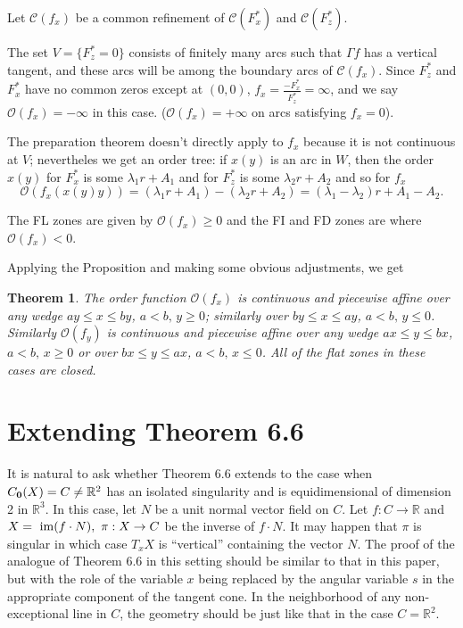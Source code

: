 \documentclass[article]{amsart}
\newtheorem{theorem}{Theorem}[section]
\newcommand{\R}{\mathbb R}
\newcommand{\0}{{\bf 0}}
\begin{document}
Let $\mathcal{C}(f_x)$ be a common refinement of 
$\mathcal{C}(F_x^*)$ and $\mathcal{C}(F_z^*)$.
 
The set $V = \{ F^*_z =0\}$ consists of finitely many arcs such that $\Gamma f$ has a vertical tangent, and these arcs will be among the boundary  arcs of  $\mathcal{C}(f_x)$. Since $F^*_z$ and  $F^*_x$ have no common zeros except at $(0,0)$, $f_x=\frac{-F^*_x}{F_z^*} =\infty$, and we say $\mathcal{O}(f_x)=-\infty$ in this case. ($\mathcal{O}(f_x)=+\infty$ on arcs satisfying $f_x=0$).

The preparation theorem doesn't directly apply to $f_x$ because it is not continuous at $V$; nevertheles we get an order tree:
if $x(y)$ is an arc in $W$, then the order $x(y)$ for $F_x^*$ is some $\lambda_1r + A_1$ and for $F_z^*$ is some $\lambda_2r + A_2$ and so for $f_x $ $$\mathcal{O}(f_x(x(y)y)) =(\lambda_1r+A_1)-(\lambda_2r + A_2) = (\lambda_1 -\lambda_2)r + A_1 - A_2.$$ 

The FL zones are given by $\mathcal{O}(f_x) \ge 0$ and the FI and FD zones are where $\mathcal{O}(f_x) <0$.

Applying the Proposition and making some obvious adjustments, we get  

\begin{theorem} The order function $\mathcal{O}(f_x)$ is continuous and piecewise affine over any wedge  $ay\le x\le by$, $a<b,\, y\ge 0$; similarly over  $by\le x\le ay$, $a<b,\, y \le 0$.  Similarly $\mathcal{O}(f_y)$ is continuous and piecewise affine over any wedge  $ax\le y\le bx$, $a<b,\, x\ge 0$ or over  $bx\le y\le ax$, $a<b,\, x \le 0$.  All of the flat zones in these cases are closed.    
\end{theorem}




\section{Extending Theorem 6.6}

It is natural to ask whether Theorem 6.6 extends to the case when
$C_{\bf0}(X) = C \ne \R^2$ has an isolated singularity and is equidimensional of dimension 2 in 
$\R^3$.  In this case, let $N$ be a unit normal vector field on $C$. Let $f: C \rightarrow \R$ and $X = \ {\rm im}(f\cdot N),
\ \pi:X\rightarrow C$ be the inverse of $f\cdot N$.  It may happen that $\pi$ is singular in which case $T_xX$ 
is ``vertical'' containing the vector $N$.  The proof of the analogue of Theorem 6.6 in this setting should
be similar to that in this paper, but with the role of the variable $x$ being replaced by the angular variable $s$ in the
appropriate component of the tangent cone. In the neighborhood of any non-exceptional line in $C$, the geometry should be just like that in the case $C = \R^2$.   
\end{document}
